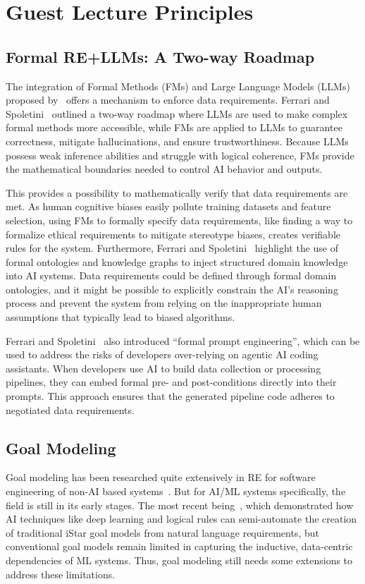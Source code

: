 \section{Guest Lecture Principles}
\subsection{Formal RE+LLMs: A Two-way Roadmap}
The integration of Formal Methods (FMs) and Large Language Models (LLMs) proposed by~\cite{ferrari2025formal} offers a mechanism to enforce data requirements. Ferrari and Spoletini~\cite{ferrari2025formal} outlined a two-way roadmap where LLMs are used to make complex formal methods more accessible, while FMs are applied to LLMs to guarantee correctness, mitigate hallucinations, and ensure trustworthiness. Because LLMs possess weak inference abilities and struggle with logical coherence, FMs provide the mathematical boundaries needed to control AI behavior and outputs. 

This provides a possibility to mathematically verify that data requirements are met. As human cognitive biases easily pollute training datasets and feature selection, using FMs to formally specify data requirements, like finding a way to formalize ethical requirements to mitigate stereotype biases, creates verifiable rules for the system. Furthermore, Ferrari and Spoletini~\cite{ferrari2025formal} highlight the use of formal ontologies and knowledge graphs to inject structured domain knowledge into AI systems. Data requirements could be defined through formal domain ontologies, and it might be possible to explicitly constrain the AI's reasoning process and prevent the system from relying on the inappropriate human assumptions that typically lead to biased algorithms.

Ferrari and Spoletini~\cite{ferrari2025formal} also introduced ``formal prompt engineering'', which can be used to address the risks of developers over-relying on agentic AI coding assistants. When developers use AI to build data collection or processing pipelines, they can embed formal pre- and post-conditions directly into their prompts. This approach ensures that the generated pipeline code adheres to negotiated data requirements.

\subsection{Goal Modeling}
Goal modeling has been researched quite extensively in RE for software engineering of non-AI based systems~\cite{van2001goal}. But for AI/ML systems specifically, the field is still in its early stages. The most recent being~\cite{li2026interactive}, which demonstrated how AI techniques like deep learning and logical rules can semi-automate the creation of traditional iStar goal models from natural language requirements, but conventional goal models remain limited in capturing the inductive, data-centric dependencies of ML systems. Thus, goal modeling still needs some extensions to address these limitations.

